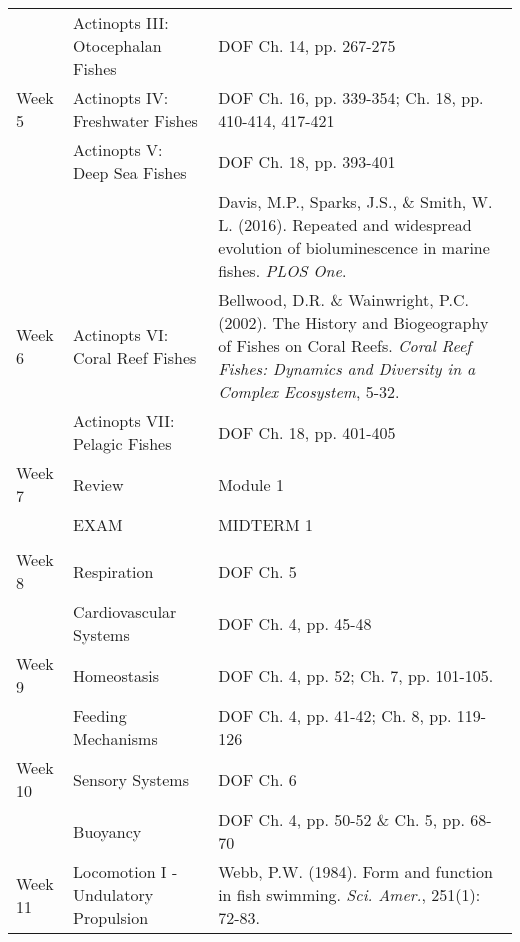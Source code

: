 \documentclass[letterpaper]{inzane_syllabus} %
\begin{document}
\begin{center}
\begin{tabularx}{\textwidth}{p{2cm}p{8cm}p{9.5cm}}
& Actinopts III: Otocephalan Fishes & DOF Ch. 14, pp. 267-275 \\

\arrayrulecolor{maingray}\hline
Week 5 & Actinopts IV: Freshwater Fishes & DOF Ch. 16, pp. 339-354; Ch. 18, pp. 410-414, 417-421 \\

& Actinopts V: Deep Sea Fishes & DOF Ch. 18, pp. 393-401 \\
& & Davis, M.P., Sparks, J.S., \& Smith, W. L. (2016). Repeated and widespread evolution of bioluminescence in marine fishes. \textit{PLOS One}.\\
\arrayrulecolor{maingray}\hline
Week 6 & Actinopts VI: Coral Reef Fishes & Bellwood, D.R. \& Wainwright, P.C. (2002). The History and Biogeography of Fishes on Coral Reefs. \textit{Coral Reef Fishes: Dynamics and Diversity in a Complex Ecosystem}, 5-32. \\

 & Actinopts VII: Pelagic Fishes & DOF Ch. 18, pp. 401-405 \\
 \arrayrulecolor{maingray}\hline
 Week 7 & Review & Module 1 \\
 &EXAM &  MIDTERM 1 \\
 
 \arrayrulecolor{myCOLOR}\hline
\multicolumn{2}{l}{\textbf{\textcolor{myCOLOR}{\large MODULE 2: What Makes a Fish }}} \\
\hline
 Week 8 & Respiration & DOF Ch. 5 \\
 
 & Cardiovascular Systems & DOF Ch. 4, pp. 45-48 \\
 \arrayrulecolor{maingray}\hline
Week 9 & Homeostasis & DOF Ch. 4, pp. 52; Ch. 7, pp. 101-105.\\

& Feeding Mechanisms & DOF Ch. 4, pp. 41-42; Ch. 8, pp. 119-126  \\
\arrayrulecolor{maingray}\hline
Week 10 & Sensory Systems & DOF Ch. 6 \\

&  Buoyancy & DOF Ch. 4, pp. 50-52  \& Ch. 5, pp. 68-70 \\
\arrayrulecolor{maingray}\hline
Week 11 &  Locomotion I - Undulatory Propulsion &  Webb, P.W. (1984). Form and function in fish swimming. \textit{Sci. Amer.}, 251(1): 72-83. \\


\end{tabularx}
\end{center}
\end{document}

